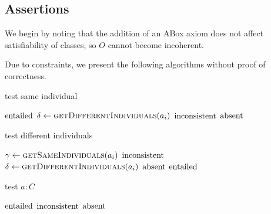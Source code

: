 \documentclass[paper.tex]{subfiles}
\begin{document}
\subsection{Assertions}
\label{sec:algorithms:assert}

We begin by noting that the addition of an ABox axiom does not affect satisfiability of classes, so $O$ cannot become incoherent.

Due to constraints, we present the following algorithms without proof of correctness.  

\begin{algorithm}[H]
  \caption{test same individual}
  \begin{algorithmic}[1]
    \raggedright
        \State \Return $\mathrm{entailed}$
      \Else
          \State $\delta \gets \Call{getDifferentIndividuals}{a_i}$
            \State \Return $\mathrm{inconsistent}$
          \EndIf
        \EndFor
        \State \Return $\mathrm{absent}$
      \EndIf
    \EndFunction
  \end{algorithmic}
\end{algorithm}

\begin{algorithm}[H]
  \caption{test different individuals}
  \begin{algorithmic}[1]
    \raggedright
        \State $\gamma \gets \Call{getSameIndividuals}{a_i}$
          \State \Return $\mathrm{inconsistent}$
        \EndIf
      \EndFor
        \State $\delta \gets \Call{getDifferentIndividuals}{a_i}$
          \State \Return $\mathrm{absent}$
        \EndIf
      \EndFor
      \State \Return $\mathrm{entailed}$
    \EndFunction
  \end{algorithmic}
\end{algorithm}

\begin{algorithm}[H]
  \caption{test $a : C$}
  \begin{algorithmic}[1]
    \raggedright
        \State \Return $\mathrm{entailed}$
        \State \Return $\mathrm{inconsistent}$
      \Else
        \State \Return $\mathrm{absent}$
      \EndIf
    \EndFunction
  \end{algorithmic}
\end{algorithm}
\end{document}
